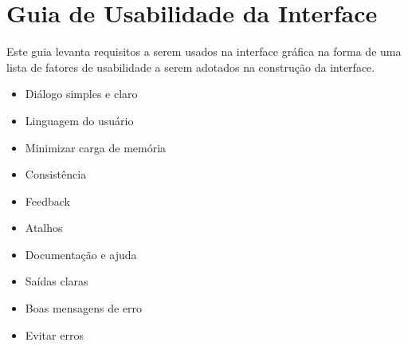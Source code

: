 \documentclass[a4paper,10pt]{report}
\begin{document}
\section{Guia de Usabilidade da Interface}

Este guia levanta requisitos a serem usados na interface gráfica na forma de uma lista de fatores de usabilidade a serem adotados na construção da interface. 

\begin{itemize}
 \item Diálogo simples e claro 
 \item Linguagem do usuário
 \item Minimizar carga de memória
 \item Consistência
 \item Feedback
 \item Atalhos
 \item Documentação e ajuda
 \item Saídas claras
 \item Boas mensagens de erro
 \item Evitar erros
\end{itemize}


\end{document}
